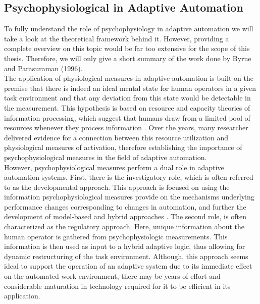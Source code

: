 \subsection{Psychophysiological in Adaptive Automation}
To fully understand the role of psychophysiology in adaptive automation we will take a look at the theoretical framework behind it. However, providing a complete overview on this topic would be far too extensive for the scope of this thesis. Therefore, we will only give a short summary of the work done by Byrne and Parasuraman (1996).\\
The application of physiological measures in adaptive automation is built on the premise that there is indeed an ideal mental state for human operators in a given task environment and that any deviation from this state would be detectable in the measurement. 
This hypothesis is based on resource and capacity theories of information processing, which suggest that humans draw from a limited pool of resources whenever they process information \cite{Byrne1996}. Over the years, many researcher delivered evidence for a connection between this resource utilization and physiological measures of activation, therefore establishing the importance of psychophysiological measures in the field of adaptive automation.\\
However, psychophysiological measures perform a dual role in adaptive automation systems. First, there is the investigatory role, which is often referred to as the developmental approach. This approach is focused on using the information psychophysiological measures provide on the mechanisms underlying performance changes corresponding to changes in automation, and further the development of model-based and hybrid approaches \cite{Byrne1996}. The second role, is often characterized as the regulatory approach. Here, unique information about the human operator is gathered from psychophysiologic measurements. This information is then used as input to a hybrid adaptive logic, thus allowing for dynamic restructuring of the task environment. Although, this approach seems ideal to support the operation of an adaptive system due to its immediate effect on the automated work environment, there may be years of effort and considerable maturation in technology required for it to be efficient in its application.  

